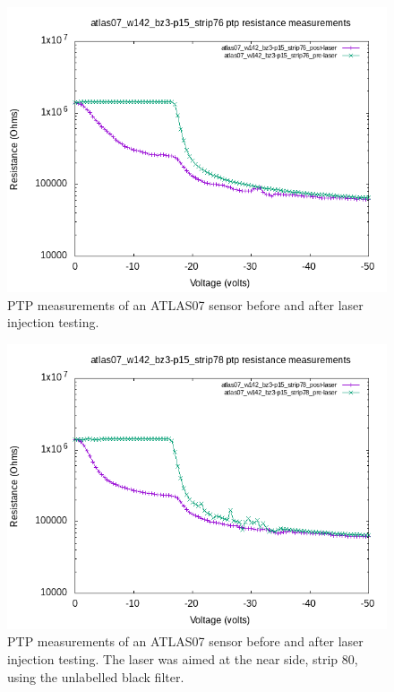 \documentclass{report}
\begin{document}
            \begin{figure}[h] 
                \includegraphics[height=.4\textheight]{atlas07_w142_bz3-p15_strip76_resistance_plots}
                \centering
                \caption{ PTP measurements of an ATLAS07 sensor before and after laser injection testing. }
                \label{fig:atlas07_w142_bz3-p15_strip76_resistance_plots}
            \end{figure}

            \begin{figure}[h] 
                \includegraphics[height=.4\textheight]{atlas07_w142_bz3-p15_strip78_resistance_plots}
                \centering
                \caption{ PTP measurements of an ATLAS07 sensor before and after laser injection testing. The laser was aimed at the near side, strip 80, using the unlabelled black filter. }
                \label{fig:atlas07_w142_bz3-p15_strip78_resistance_plots}
            \end{figure}
\end{document}
